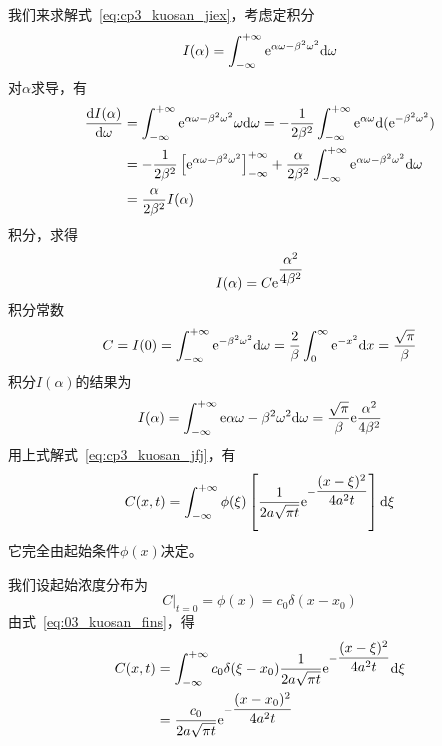 我们来求解式~\eqref{eq:cp3_kuosan_jiex}，考虑定积分
\begin{equation*}
 I(\alpha)=\int_{-\infty}^{+\infty}\mathrm{e}^{\alpha\omega-\beta^2\omega^2}\mathrm{d}\omega
\end{equation*}
对$\alpha$求导，有
\begin{equation*}
 \begin{aligned}
 \dfrac{\mathrm{d} I(\alpha)}{\mathrm{d}\omega} & = \int_{-\infty}^{+\infty}\mathrm{e}^{\alpha\omega-\beta^2\omega^2}\omega\mathrm{d}\omega
 =-\dfrac{1}{2\beta^2}\int_{-\infty}^{+\infty}\mathrm{e}^{\alpha\omega}\mathrm{d}(\mathrm{e}^{-\beta^2\omega^2})\\
 &=-\dfrac{1}{2\beta^2}\left[\mathrm{e}^{\alpha\omega-\beta^2\omega^2}\right]^{+\infty}_{-\infty}+\dfrac{\alpha}{2\beta^2}
 \int^{+\infty}_{-\infty}\mathrm{e}^{\alpha\omega-\beta^2\omega^2}\mathrm{d}\omega\\
 &=\dfrac{\alpha}{2\beta^2}I(\alpha)
 \end{aligned}
\end{equation*}
积分，求得
\begin{equation}
 I(\alpha)=C\mathrm{e}^{\dfrac{\alpha^2}{4\beta^2}}
\end{equation}
积分常数
\begin{equation*}
 C=I(0)=\int_{-\infty}^{+\infty}\mathrm{e}^{-\beta^2\omega^2}\mathrm{d}\omega
       =\dfrac{2}{\beta}\int_0^{\infty}\mathrm{e}^{-x^2}\mathrm{d} x=\dfrac{\sqrt{\pi}}{\beta}
\end{equation*}
积分$I(\alpha)$的结果为
\begin{equation}\label{eq:03_kuosan_gs}
 I(\alpha)=\int_{-\infty}^{+\infty}\mathrm{e}{\alpha\omega-\beta^2\omega^2}\mathrm{d}\omega
          =\dfrac{\sqrt{\pi}}{\beta}\mathrm{e}{\dfrac{\alpha^2}{4\beta^2}}
\end{equation}
用上式解式~\eqref{eq:cp3_kuosan_jfj}，有
\begin{equation}\label{eq:03_kuosan_fins}
 C(x,t)=\int_{-\infty}^{+\infty}\phi(\xi)\left[\dfrac{1}{2a\sqrt{\pi t}}\mathrm{e}^{-\dfrac{(x-\xi)^2}{4a^2t}}\right]\mathrm{d}\xi
\end{equation}
它完全由起始条件$\phi(x)$决定。\par
我们设起始浓度分布为
\begin{equation*}
 \left.C\right|_{t=0}=\phi(x)=c_0\delta(x-x_0)
\end{equation*}
由式~\eqref{eq:03_kuosan_fins}，得
\begin{equation}
 \begin{split}
  C(x,t)&=\int_{-\infty}^{+\infty}c_0\delta(\xi-x_0)\dfrac{1}{2a\sqrt{\pi t}}\mathrm{e}^{-\dfrac{(x-\xi)^2}{4a^2t}}\mathrm{d}\xi \\
        &=\dfrac{c_0}{2a\sqrt{\pi t}}\mathrm{e}^{-\dfrac{(x-x_0)^2}{4a^2t}}
 \end{split}
\end{equation}
